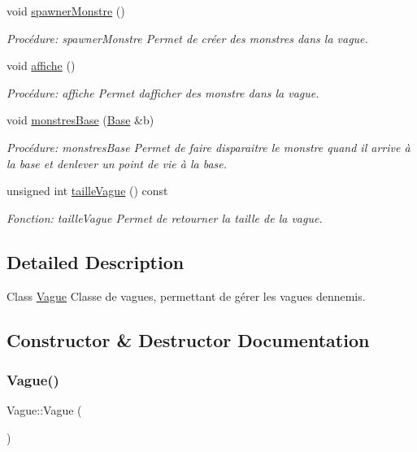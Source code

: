 \begin{DoxyCompactItemize}
void \hyperlink{classVague_a0cfa903ba06db46ba3d45ceae6a89052}{spawner\+Monstre} ()
\begin{DoxyCompactList}\small\item\em Procédure\+: spawner\+Monstre Permet de créer des monstres dans la vague. \end{DoxyCompactList}\item 
void \hyperlink{classVague_adec201ad91a86f65bf6aaf0ddb73bd20}{affiche} ()
\begin{DoxyCompactList}\small\item\em Procédure\+: affiche Permet d\textquotesingle{}afficher des monstre dans la vague. \end{DoxyCompactList}\item 
void \hyperlink{classVague_ad9d543a1eafc579d8a4de88d278a53a7}{monstres\+Base} (\hyperlink{classBase}{Base} \&b)
\begin{DoxyCompactList}\small\item\em Procédure\+: monstres\+Base Permet de faire disparaitre le monstre quand il arrive à la base et d\textquotesingle{}enlever un point de vie à la base. \end{DoxyCompactList}\item 
unsigned int \hyperlink{classVague_a00fd363241fbfd6ed6819d408155a6ee}{taille\+Vague} () const
\begin{DoxyCompactList}\small\item\em Fonction\+: taille\+Vague Permet de retourner la taille de la vague. \end{DoxyCompactList}\end{DoxyCompactItemize}


\subsection{Detailed Description}
Class \hyperlink{classVague}{Vague} Classe de vagues, permettant de gérer les vagues d\textquotesingle{}ennemis. 

\subsection{Constructor \& Destructor Documentation}
\mbox{\label{classVague_ab1e4786aa02ad641431b56658dbbaac3}} 
\subsubsection{\texorpdfstring{Vague()}{Vague()}\hspace{0.1cm}{\footnotesize\ttfamily [1/3]}}
{\footnotesize\ttfamily Vague\+::\+Vague (\begin{DoxyParamCaption}{ }\end{DoxyParamCaption})}




